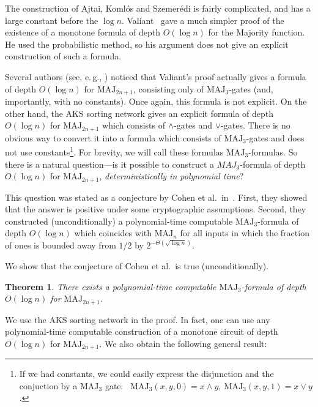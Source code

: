 \documentclass[11pt]{article}
\numberwithin{equation}{section}
\newtheorem{theorem}{Theorem}[section]
\theoremstyle{definition}
\theoremstyle{plain}
\newcommand{\eg}{e.\,g.}
\def\MAJ{\mathrm{MAJ}}
\begin{document}
The construction of Ajtai, Koml\'{o}s and Szemer\'{e}di is fairly complicated, and has a %
large  %
constant before the $\log n$. Valiant~\cite{val84} gave a much simpler proof of %
the existence  %
%
of a monotone formula of depth $O(\log n)$
for the Majority function. He used the probabilistic method, so his argument does not give an explicit construction of such a formula.



Several authors (see, \eg, \cite{Gol2011,Cohen2013}) noticed that Valiant's proof actually gives 
%
a formula of depth $O(\log n)$  %
for $\MAJ_{2n+1}$, consisting only of $\MAJ_3$-gates (and, importantly, with no constants). Once again, this formula is not explicit. On the other hand, the AKS sorting network gives an explicit
%
formula of depth $O(\log n)$  %
for $\MAJ_{2n + 1}$ which consists of $\land$-gates and $\lor$-gates. There is no obvious way to convert it into a formula which consists of $\MAJ_3$-gates and does not use constants\footnote{If we %
had  %
constants, we could easily express the disjunction and the conjuction by
a $\MAJ_3$ gate:\  %
$\MAJ_3(x, y, 0) = x\land y,\ \MAJ_3(x, y, 1) = x\lor y$.}. For brevity, we will call these formulas $\MAJ_3$-formulas. So there is a natural 
question---is it possible %
to construct 
%
a $MAJ_3$-formula %
of depth $O(\log n)$  %
for $\MAJ_{2n + 1}$, \emph{deterministically in polynomial time}?
 
This question was stated as a conjecture by Cohen et al.~in~\cite{Cohen2013}. First, they showed that the answer is positive under some cryptographic assumptions. %
Second,  %
they constructed (unconditionally) a polynomial-time computable 
%
$\MAJ_3$-formula of depth $O(\log n)$  %
which coincides with $\MAJ_n$ for all inputs in which the fraction of ones is bounded away from $1/2$ by $2^{-\Theta(\sqrt{\log n})}$.

We show that the conjecture of Cohen et al.~is true (unconditionally).

\begin{theorem}
\label{cohen_conj_1}
There exists a polynomial-time computable 
%
$\MAJ_3$-formula of depth $O(\log n)$  %
for $\MAJ_{2n + 1}$.
\end{theorem}
We use the AKS sorting network in the proof. In fact, one can use any polynomial-time computable construction of 
%
a monotone circuit of depth $O(\log n)$  %
for $\MAJ_{2n + 1}$. We also obtain the following general result:
\end{document}

